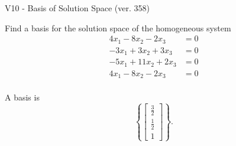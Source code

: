 \begin{exercise}
  \begin{exerciseTitle}V10 - Basis of Solution Space (ver. 358)\end{exerciseTitle}
  \begin{exerciseStatement}
    Find a basis for the solution space of the homogeneous system 
\begin{align*}
 4 x_ 1 -8 x_ 2 -2 x_ 3 &= 0  \\ 
  -3 x_ 1 + 3 x_ 2 + 3 x_ 3 &= 0  \\ 
  -5 x_ 1 + 11 x_ 2 + 2 x_ 3 &= 0  \\ 
  4 x_ 1 -8 x_ 2 -2 x_ 3 &= 0  \\ 
 \end{align*}


 
  \end{exerciseStatement}

  \begin{exerciseAnswer}
   A basis is   
\[\left\{\left[\begin{array}{c}
\frac{3}{2} \\
\frac{1}{2} \\
1
\end{array}\right]\right\}.\]

  


  \end{exerciseAnswer}
\end{exercise}